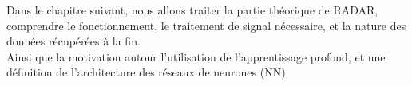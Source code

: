 \medskip
Dans le chapitre suivant, nous allons traiter la partie théorique de RADAR, comprendre le fonctionnement, le traitement de signal nécessaire, et la nature des données récupérées à la fin.\\
Ainsi que la motivation autour l'utilisation de l'apprentissage profond, et une définition de l'architecture des réseaux de neurones (NN).


